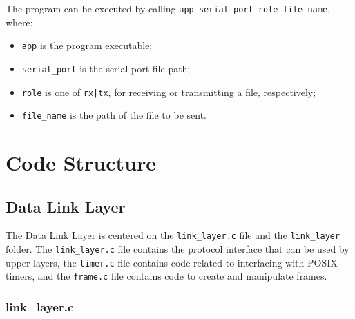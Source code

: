 \documentclass[11pt,a4paper]{article}
\begin{document}
The program can be executed by calling \lstinline{app serial_port role file_name}, where:

\begin{itemize}
    \item \lstinline{app} is the program executable;
    \item \lstinline{serial_port} is the serial port file path;
    \item \lstinline{role} is one of \lstinline{rx|tx}, for receiving or transmitting a file, respectively;
    \item \lstinline{file_name} is the path of the file to be sent.
\end{itemize}

\section{Code Structure}

\subsection{Data Link Layer}
\label{sec:dll}

The Data Link Layer is centered on the \lstinline{link_layer.c} file and the \lstinline{link_layer} folder.
The \lstinline{link_layer.c} file contains the protocol interface that can be used by upper layers, the \lstinline{timer.c} file contains code related to interfacing with POSIX timers, and the \lstinline{frame.c} file contains code to create and manipulate frames.

\subsubsection{link\_layer.c}
\end{document}
